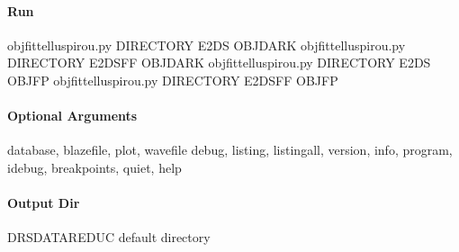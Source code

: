 \documentclass[a4paper,10pt,english]{report}
\begin{document}
\paragraph{Run}
\label{\detokenize{user/spirou/recipes/fit_tellu:run}}
\begin{sphinxVerbatim}[commandchars=\\\{\}]
obj\PYGZus{}fit\PYGZus{}tellu\PYGZus{}spirou.py \PYG{o}{[}DIRECTORY\PYG{o}{]} \PYG{o}{[}E2DS  OBJ\PYGZus{}DARK\PYG{o}{]}
obj\PYGZus{}fit\PYGZus{}tellu\PYGZus{}spirou.py \PYG{o}{[}DIRECTORY\PYG{o}{]} \PYG{o}{[}E2DSFF  OBJ\PYGZus{}DARK\PYG{o}{]}
obj\PYGZus{}fit\PYGZus{}tellu\PYGZus{}spirou.py \PYG{o}{[}DIRECTORY\PYG{o}{]} \PYG{o}{[}E2DS  OBJ\PYGZus{}FP\PYG{o}{]}
obj\PYGZus{}fit\PYGZus{}tellu\PYGZus{}spirou.py \PYG{o}{[}DIRECTORY\PYG{o}{]} \PYG{o}{[}E2DSFF  OBJ\PYGZus{}FP\PYG{o}{]}
\end{sphinxVerbatim}


\paragraph{Optional Arguments}
\label{\detokenize{user/spirou/recipes/fit_tellu:optional-arguments}}
\begin{sphinxVerbatim}[commandchars=\\\{\}]
\PYGZhy{}\PYGZhy{}database, \PYGZhy{}\PYGZhy{}blazefile, \PYGZhy{}\PYGZhy{}plot, \PYGZhy{}\PYGZhy{}wavefile
\PYGZhy{}\PYGZhy{}debug, \PYGZhy{}\PYGZhy{}listing, \PYGZhy{}\PYGZhy{}listingall, \PYGZhy{}\PYGZhy{}version, \PYGZhy{}\PYGZhy{}info,
\PYGZhy{}\PYGZhy{}program, \PYGZhy{}\PYGZhy{}idebug, \PYGZhy{}\PYGZhy{}breakpoints, \PYGZhy{}\PYGZhy{}quiet, \PYGZhy{}\PYGZhy{}help
\end{sphinxVerbatim}


\paragraph{Output Dir}
\label{\detokenize{user/spirou/recipes/fit_tellu:output-dir}}
\begin{sphinxVerbatim}[commandchars=\\\{\}]
DRS\PYGZus{}DATA\PYGZus{}REDUC    default  directory
\end{sphinxVerbatim}
\end{document}
